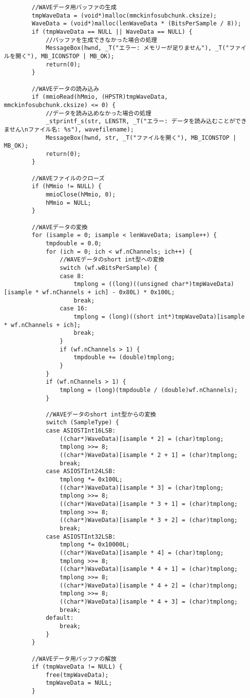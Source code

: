 \begin{verbatim}
		//WAVEデータ用バッファの生成
		tmpWaveData = (void*)malloc(mmckinfosubchunk.cksize);
		WaveData = (void*)malloc(lenWaveData * (BitsPerSample / 8));
		if (tmpWaveData == NULL || WaveData == NULL) {
			//バッファを生成できなかった場合の処理
			MessageBox(hwnd, _T("エラー: メモリーが足りません"), _T("ファイルを開く"), MB_ICONSTOP | MB_OK);
			return(0);
		}

		//WAVEデータの読み込み
		if (mmioRead(hMmio, (HPSTR)tmpWaveData, mmckinfosubchunk.cksize) <= 0) {
			//データを読み込めなかった場合の処理
			_stprintf_s(str, LENSTR, _T("エラー: データを読み込むことができません\nファイル名: %s"), wavefilename);
			MessageBox(hwnd, str, _T("ファイルを開く"), MB_ICONSTOP | MB_OK);
			return(0);
		}

		//WAVEファイルのクローズ
		if (hMmio != NULL) {
			mmioClose(hMmio, 0);
			hMmio = NULL;
		}

		//WAVEデータの変換
		for (isample = 0; isample < lenWaveData; isample++) {
			tmpdouble = 0.0;
			for (ich = 0; ich < wf.nChannels; ich++) {
				//WAVEデータのshort int型への変換
				switch (wf.wBitsPerSample) {
				case 8:
					tmplong = ((long)((unsigned char*)tmpWaveData)[isample * wf.nChannels + ich] - 0x80L) * 0x100L;
					break;
				case 16:
					tmplong = (long)((short int*)tmpWaveData)[isample * wf.nChannels + ich];
					break;
				}
				if (wf.nChannels > 1) {
					tmpdouble += (double)tmplong;
				}
			}
			if (wf.nChannels > 1) {
				tmplong = (long)(tmpdouble / (double)wf.nChannels);
			}

			//WAVEデータのshort int型からの変換
			switch (SampleType) {
			case ASIOSTInt16LSB:
				((char*)WaveData)[isample * 2] = (char)tmplong;
				tmplong >>= 8;
				((char*)WaveData)[isample * 2 + 1] = (char)tmplong;
				break;
			case ASIOSTInt24LSB:
				tmplong *= 0x100L;
				((char*)WaveData)[isample * 3] = (char)tmplong;
				tmplong >>= 8;
				((char*)WaveData)[isample * 3 + 1] = (char)tmplong;
				tmplong >>= 8;
				((char*)WaveData)[isample * 3 + 2] = (char)tmplong;
				break;
			case ASIOSTInt32LSB:
				tmplong *= 0x10000L;
				((char*)WaveData)[isample * 4] = (char)tmplong;
				tmplong >>= 8;
				((char*)WaveData)[isample * 4 + 1] = (char)tmplong;
				tmplong >>= 8;
				((char*)WaveData)[isample * 4 + 2] = (char)tmplong;
				tmplong >>= 8;
				((char*)WaveData)[isample * 4 + 3] = (char)tmplong;
				break;
			default:
				break;
			}
		}

		//WAVEデータ用バッファの解放
		if (tmpWaveData != NULL) {
			free(tmpWaveData);
			tmpWaveData = NULL;
		}


\end{verbatim}
